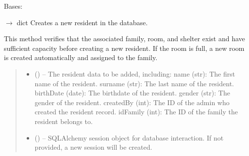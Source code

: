\documentclass[letterpaper,10pt,english]{sphinxmanual}
\begin{document}
\begin{fulllineitems}
\label{\detokenize{app.controllers:app.controllers.resident_controller.ResidentController}}
\pysigstartsignatures
\pysiglinewithargsret
{}
{}
{}
\pysigstopsignatures
\sphinxAtStartPar
Bases: 

\begin{fulllineitems}
\label{\detokenize{app.controllers:app.controllers.resident_controller.ResidentController.create_resident}}
\pysigstartsignatures
\pysiglinewithargsret
{}
{\sphinxparamcomma {}}
{{ $\rightarrow$ dict}}
\pysigstopsignatures
\sphinxAtStartPar
Creates a new resident in the database.

\sphinxAtStartPar
This method verifies that the associated family, room, and shelter exist
and have sufficient capacity before creating a new resident. If the room is full,
a new room is created automatically and assigned to the family.
\begin{quote}\begin{description}
\begin{itemize}
\item {} 
\sphinxAtStartPar
{} () – The resident data to be added, including:
\sphinxhyphen{} name (str): The first name of the resident.
\sphinxhyphen{} surname (str): The last name of the resident.
\sphinxhyphen{} birthDate (date): The birthdate of the resident.
\sphinxhyphen{} gender (str): The gender of the resident.
\sphinxhyphen{} createdBy (int): The ID of the admin who created the resident record.
\sphinxhyphen{} idFamily (int): The ID of the family the resident belongs to.

\item {} 
\sphinxAtStartPar
{} (\sphinxstyleliteralemphasis{\sphinxupquote{, }}) – SQLAlchemy session object for database interaction.
If not provided, a new session will be created.


\end{itemize}
\end{description}
\end{quote}
\end{fulllineitems}
\end{fulllineitems}
\end{document}
